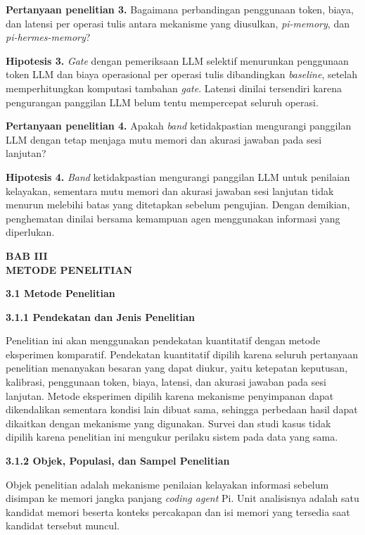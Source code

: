 \documentclass[12pt,a4paper]{article}
\newcommand{\asing}[1]{\textit{#1}}
\newcommand{\pim}{\textit{pi-memory}}
\newcommand{\phm}{\textit{pi-hermes-memory}}
\newcommand{\bab}[3]{%
  \clearpage\phantomsection\label{#3}%
  \begin{center}\large\bfseries BAB #1\\[0.2em] #2\end{center}\vspace{0.8em}}
\newcommand{\subbab}[2]{%
  \par\vspace{0.8em}\phantomsection\label{#2}%
  \noindent\textbf{#1}\par\nopagebreak\vspace{0.3em}}
\newcommand{\subsubbab}[2]{%
  \par\vspace{0.5em}\phantomsection\label{#2}%
  \noindent\textbf{#1}\par\nopagebreak\vspace{0.2em}}
\begin{document}
\textbf{Pertanyaan penelitian 3.} Bagaimana perbandingan penggunaan token, biaya, dan latensi per operasi tulis antara mekanisme yang diusulkan, \pim{}, dan \phm{}?

\textbf{Hipotesis 3.} \asing{Gate} dengan pemeriksaan LLM selektif menurunkan penggunaan token LLM dan biaya operasional per operasi tulis dibandingkan \asing{baseline}, setelah memperhitungkan komputasi tambahan \asing{gate}. Latensi dinilai tersendiri karena pengurangan panggilan LLM belum tentu mempercepat seluruh operasi.

\textbf{Pertanyaan penelitian 4.} Apakah \asing{band} ketidakpastian mengurangi panggilan LLM dengan tetap menjaga mutu memori dan akurasi jawaban pada sesi lanjutan?

\textbf{Hipotesis 4.} \asing{Band} ketidakpastian mengurangi panggilan LLM untuk penilaian kelayakan, sementara mutu memori dan akurasi jawaban sesi lanjutan tidak menurun melebihi batas yang ditetapkan sebelum pengujian. Dengan demikian, penghematan dinilai bersama kemampuan agen menggunakan informasi yang diperlukan.

\bab{III}{METODE PENELITIAN}{sec:bab3}

\subbab{3.1 Metode Penelitian}{sec:3.1}

\subsubbab{3.1.1 Pendekatan dan Jenis Penelitian}{sec:3.1.1}

Penelitian ini akan menggunakan pendekatan kuantitatif dengan metode eksperimen komparatif. Pendekatan kuantitatif dipilih karena seluruh pertanyaan penelitian menanyakan besaran yang dapat diukur, yaitu ketepatan keputusan, kalibrasi, penggunaan token, biaya, latensi, dan akurasi jawaban pada sesi lanjutan. Metode eksperimen dipilih karena mekanisme penyimpanan dapat dikendalikan sementara kondisi lain dibuat sama, sehingga perbedaan hasil dapat dikaitkan dengan mekanisme yang digunakan. Survei dan studi kasus tidak dipilih karena penelitian ini mengukur perilaku sistem pada data yang sama.

\subsubbab{3.1.2 Objek, Populasi, dan Sampel Penelitian}{sec:3.1.2}

Objek penelitian adalah mekanisme penilaian kelayakan informasi sebelum disimpan ke memori jangka panjang \asing{coding agent} Pi. Unit analisisnya adalah satu kandidat memori beserta konteks percakapan dan isi memori yang tersedia saat kandidat tersebut muncul.
\end{document}
